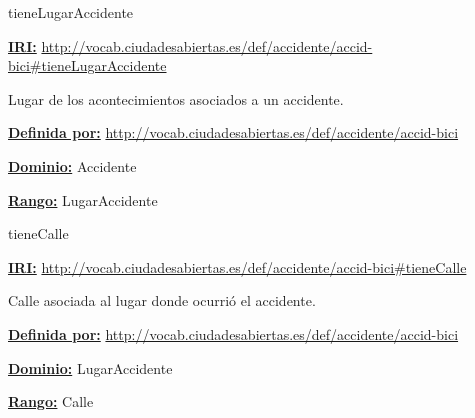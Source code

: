 \begin{mybox}{tieneLugarAccidente}
\begin{flushleft}
\underline{\textbf{IRI:}}
\url{http://vocab.ciudadesabiertas.es/def/accidente/accid-bici#tieneLugarAccidente}
\newline

Lugar de los acontecimientos asociados a un accidente.
\newline

\underline{\textbf{Definida por:}}
\newline \url{http://vocab.ciudadesabiertas.es/def/accidente/accid-bici}
\newline

\underline{\textbf{Dominio:}} 
\newline Accidente
\newline

\underline{\textbf{Rango:}} 
\newline LugarAccidente
\newline

\end{flushleft}
\end{mybox}



\begin{mybox}{tieneCalle}
\begin{flushleft}
\underline{\textbf{IRI:}}
\url{http://vocab.ciudadesabiertas.es/def/accidente/accid-bici#tieneCalle}
\newline

Calle asociada al lugar donde ocurrió el accidente.
\newline

\underline{\textbf{Definida por:}}
\newline \url{http://vocab.ciudadesabiertas.es/def/accidente/accid-bici}
\newline

\underline{\textbf{Dominio:}}
\newline LugarAccidente
\newline

\underline{\textbf{Rango:}}
\newline Calle
\newline


\end{flushleft}
\end{mybox}




